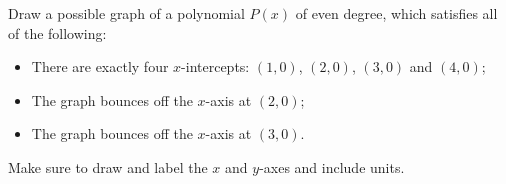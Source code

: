 \documentclass[11pt,answers]{exam}
\begin{document}
\begin{questions}
\begin{parts}
\fillwithdottedlines{3cm}

\end{parts}

\bonusquestion[2]  Draw a possible graph of a polynomial $P(x)$ of even degree, which satisfies all of the following:
\begin{itemize}
	\item There are exactly four $x$-intercepts:  $(1,0)$, $(2,0)$, $(3,0)$ and $(4,0)$;
	\item The graph bounces off the $x$-axis at $(2,0)$;
	\item The graph bounces off the $x$-axis at $(3,0)$.
	
\end{itemize}   

Make sure to draw and label the $x$ and $y$-axes and include units.


\end{questions}
\end{document}
